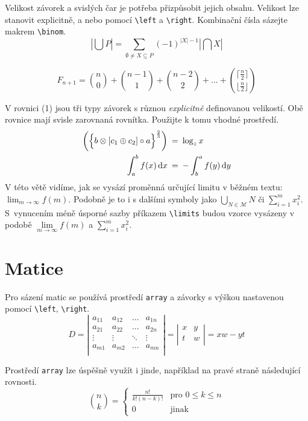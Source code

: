 \documentclass[11pt,a4paper,twocolumn]{article}
\begin{document}
Velikost závorek a svislých čar je potřeba přizpůsobit jejich obsahu. Velikost lze stanovit explicitně, a nebo pomocí \texttt{\textbackslash left} a \texttt{\textbackslash right}.
Kombinační čísla sázejte makrem \texttt{\textbackslash binom}.
\begin{displaymath}
    \left| \bigcup P \right| = \sum_{\emptyset \neq X\subseteq P}(-1)^{\left| X \right| -1} \left| \bigcap X \right|
\end{displaymath}

\begin{displaymath}
    F_{n+1} = \binom{n}{0} + \binom{n-1}{1} + \binom{n-2}{2} + \dots + \binom{\lceil \frac{n}{2} \rceil}{\lfloor \frac{n}{2} \rfloor}
\end{displaymath}

V rovnici (1) jsou tři typy závorek s různou \emph{explicitně} definovanou velikostí. Obě rovnice mají svisle zarovnaná rovnítka. Použijte k tomu vhodné prostředí.
\begin{align}
    \biggl( \Bigl\{ b \otimes [c_1 \oplus c_2] \circ a \Bigr\}^\frac{2}{3} \biggr) & \: = \: \log_{z}x                         \\
    \int_{a}^{b} f(x) \, \mathrm{d}x                                               & \: = \: -\int_{b}^{a} f(y) \, \mathrm{d}y
\end{align}
V této větě vidíme, jak se vysází proměnná určující limitu v běžném textu: $\lim_{{m \to \infty}} f(m)$. Podobně je to i s dalšími symboly jako $\bigcup_{N \in \mathcal{M}} N$ či $\sum_{i=1}^{m} x_i^2$. S~vynucením méně úsporné sazby příkazem \texttt{\textbackslash limits} budou vzorce vysázeny v podobě $\lim\limits_{m \to \infty} f(m)$ a $\sum\limits_{i=1}^{m}x_i^2$.

\section{Matice}
Pro sázení matic se používá prostředí \texttt{array} a závorky s výškou nastavenou pomocí \texttt{\textbackslash left}, \texttt{\textbackslash right}.
\[
    D = \left| \begin{array}{cccc}
        a_{11} & a_{12} & \dots  & a_{1n} \\
        a_{21} & a_{22} & \dots  & a_{2n} \\
        \vdots & \vdots & \ddots & \vdots \\
        a_{m1} & a_{m2} & \dots  & a_{mn} \\
    \end{array} \right|
    = \left| \begin{array}{cc}
        x & y \\
        t & w \\
    \end{array} \right|
    = xw - yt
\]

Prostředí \texttt{array} lze úspěšně využít i jinde, například na pravé straně následující rovnosti.
\[
    \binom{n}{k} =
    \left\{
    \begin{array}{ll}
        \frac{n!}{k!(n-k)!} & \text{pro } 0 \leq k \leq n \\
        0                   & \text{jinak}
    \end{array}
    \right.
\]
\end{document}

